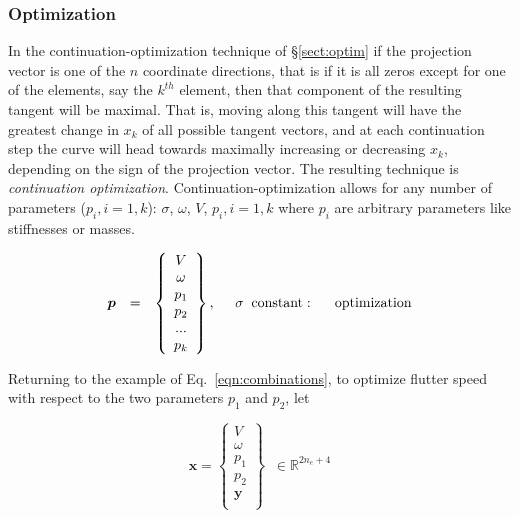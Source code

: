 \documentclass[11pt,openany,twoside]{book}
\numberwithin{equation}{section}		%
\newcommand{\Newterm}[1]{{\em #1}}	%
\newcommand{\Vector}[1]{\boldsymbol{#1}}
\newcommand{\Sectref}[1]{\S\ref{#1}}
\newcommand{\Eqn}[1]{Eq.\ \ref{#1}}  %
\begin{document}
\subsubsection{Optimization} \label{sect:cont-opt}
In the continuation-optimization technique of \Sectref{sect:optim}
if the projection vector is one of the $n$ coordinate directions,
that is if it is all zeros except for one of the elements,
say the $k^{th}$ element,
then that component of the resulting tangent will be maximal.
That is, moving along this tangent will have the greatest change
in $x_k$ of all possible tangent vectors,
and at each continuation step the curve will head towards maximally
increasing or decreasing $x_k$, depending on the sign of the projection vector.
The resulting technique is \Newterm{continuation optimization}.
Continuation-optimization allows for any number of parameters ($p_i, i=1,k$):
$\sigma$,
$\omega$,
$V$,
$p_i, i=1,k$
where
$p_i$ are arbitrary parameters like stiffnesses or masses.

\begin{equation}
\begin{array}{lclll}
\Vector{p} & = &
	\left\{ \begin{array}{c}
		V \\
		\omega \\
		p_1 \\
		p_2 \\
		... \\
		p_k
	\end{array}\right\}, \;\; & \sigma \;\;\text{constant}: & \hspace{0.1in} \text{optimization} \\[0.3in]
\end{array}
\end{equation}
\par

Returning to the example of \Eqn{eqn:combinations},
to optimize flutter speed with respect to the two parameters
$p_1$ and $p_2$, let

\begin{equation}
\label{eqn:optx}
\Vector{x} = \left\{\begin{array}{c}
V \\
\omega \\
p_1 \\
p_2 \\
\Vector{y} \\
\end{array} \right\} \;\; \in \mathbb{R}^{2n_e+4}
\end{equation}
\end{document}
